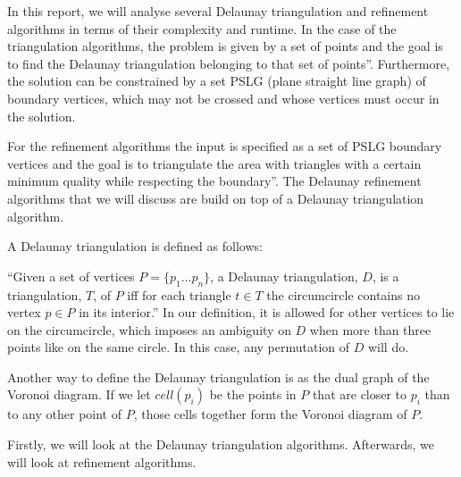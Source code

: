 In this report, we will analyse several Delaunay triangulation and refinement algorithms
in terms of their complexity and runtime.
In the case of the triangulation algorithms, the problem is given by a set of points and the goal is to find the Delaunay triangulation belonging to that set of points''.
Furthermore, the solution can be constrained by a set PSLG (plane straight line graph) of
boundary vertices, which may not be crossed and whose vertices must occur in the solution.

For the refinement algorithms the input is specified as a set of PSLG boundary vertices and the goal is to triangulate the area with triangles with a certain minimum quality while respecting the boundary''.
The Delaunay refinement algorithms that we will discuss are build on top of a Delaunay triangulation algorithm.

A Delaunay triangulation is defined as follows:

``Given a set of vertices $P = \{p_1 \ldots p_n\}$, a Delaunay triangulation, $D$, is a triangulation, $T$, of $P$
iff for each triangle $t \in T$ the circumcircle contains no vertex $p \in P$ in its interior.''
In our definition, it is allowed for other vertices to lie on the circumcircle, which imposes an ambiguity on $D$
when more than three points like on the same circle. In this case, any permutation of $D$ will do.

Another way to define the Delaunay triangulation is as the dual graph of the Voronoi diagram.
If we let $cell(p_i)$ be the points in $P$ that are closer to $p_i$ than to any other point of $P$,
those cells together form the Voronoi diagram of $P$.

Firstly, we will look at the Delaunay triangulation algorithms.
Afterwards, we will look at refinement algorithms.


